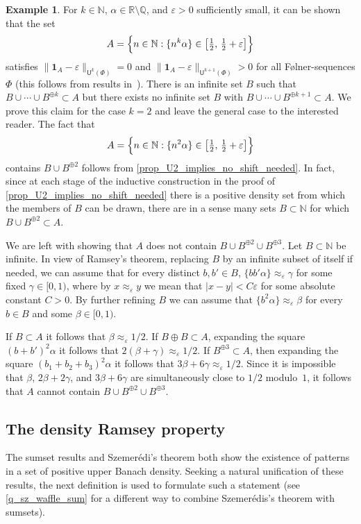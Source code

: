 \documentclass[10pt,dvipsnames]{article}
\theoremstyle{definition}
\newtheorem{example}[theorem]{Example}
\theoremstyle{plain}
\newcommand{\R}{\mathbb{R}}
\newcommand{\Q}{\mathbb{Q}}
\newcommand{\N}{\mathbb{N}}
\newcommand{\Folner}{F\o{}lner}
\newcommand{\Szemeredi}{Szemer\'{e}di}
\newcommand{\one}{\boldsymbol{1}}
\newcommand{\un}[2]{{\mathsf{U}^{#1}(#2)}}
\begin{document}
\begin{example}\label{example_nilbohrset}
For $k\in\N$, $\alpha\in\R\setminus\Q$, and $\varepsilon>0$ sufficiently small, it can be shown that the set
\[
A=\Bigl\{n\in\N: \{n^k\alpha\}\in \bigl[\tfrac{1}{2},\, \tfrac{1}{2}+\varepsilon\bigr]\Bigr\}
\]
satisfies $\|\one_A-\varepsilon\|_{\un{k}{\Phi}}=0$ and $\|\one_A-\varepsilon\|_{\un{k+1}{\Phi}}>0$ for all \Folner{}-sequences $\Phi$ (this follows from results in~\cite{FLW-2006}).
There is an infinite set $B$ such that $B\cup \cdots\cup B^{\oplus k}\subset A$ but there exists no infinite set $B$ with $B\cup \cdots\cup B^{\oplus k+1}\subset A$.
We prove this claim for the case $k=2$ and leave the general case to the interested reader.
The fact that 
\[
A=\Bigl\{n\in\N: \{n^2\alpha\}\in \bigl[\tfrac{1}{2},\, \tfrac{1}{2}+\varepsilon\bigr]\Bigr\}
\]
contains $B\cup B^{\oplus 2}$ follows from \cref{prop_U2_implies_no_shift_needed}.
In fact, since at each stage of the inductive construction in the proof of \cref{prop_U2_implies_no_shift_needed} there is a positive density set from which the members of $B$ can be drawn, there are in a sense many sets $B \subset \N$ for which $B\cup B^{\oplus 2}\subset A$.

We are left with showing that $A$ does not contain $B\cup B^{\oplus 2}\cup B^{\oplus 3}$.
Let $B\subset\N$ be infinite.
In view of Ramsey's theorem, replacing $B$ by an infinite subset of itself if needed, we can assume that for every distinct $b,b'\in B$, $\{bb'\alpha\}\approx_\varepsilon \gamma$ for some fixed $\gamma\in[0,1)$, where by $x \approx_\varepsilon y$ we mean that $|x-y| < C\varepsilon$ for some absolute constant $C > 0$.
By further refining $B$ we can assume that $\{b^2\alpha\} \approx_\varepsilon \beta$ for every $b\in B$ and some $\beta\in[0,1)$.

If $B\subset A$ it follows that $\beta\approx_\varepsilon1/2$.
If $B\oplus B\subset A$, expanding the square $(b+b')^2\alpha$ it follows that $2(\beta+\gamma)\approx_\varepsilon1/2$.
If $B^{\oplus3}\subset A$, then expanding the square $(b_1+b_2+b_3)^2\alpha$ it follows that $3\beta+6\gamma\approx_\varepsilon1/2$.
Since it is impossible that $\beta$, $2\beta+2\gamma$, and $3\beta+6\gamma$ are simultaneously close to $1/2$ modulo~$1$, it follows that $A$ cannot contain $B\cup B^{\oplus 2}\cup B^{\oplus 3}$.
\end{example}



\subsection{The density Ramsey property}
\label{sec:szemeredi-and-sumset}
The sumset results and \Szemeredi{}'s theorem both show the existence of patterns in a set of positive upper Banach density.  Seeking a natural unification of these results, the next definition is used to formulate such a statement (see \cref{q_sz_waffle_sum} for a different way to combine Szemer\'edis's theorem with sumsets).
\end{document}
